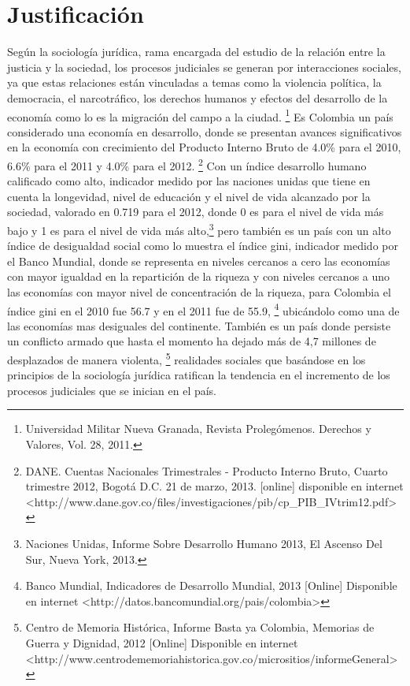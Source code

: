 \chapter{Justificaci\'on}
\label{sec:justificacion}
Seg\'un la sociolog\'ia jur\'idica, rama encargada del estudio de la relaci\'on
entre la justicia y la sociedad, los procesos judiciales se generan por
interacciones sociales, ya que estas relaciones est\'an vinculadas a temas
como la violencia pol\'itica, la democracia, el narcotr\'afico, los derechos
humanos y efectos del desarrollo de la econom\'ia como lo es la migraci\'on
del campo a la ciudad. \footnote{Universidad Militar Nueva Granada, Revista Proleg\'omenos. Derechos y Valores, Vol. 28, 2011.} 
Es Colombia un pa\'is considerado una econom\'ia en desarrollo, donde se presentan
avances significativos en la econom\'ia con crecimiento del Producto 
Interno Bruto de 4.0\% para el 2010, 6.6\% para el 2011 y 4.0\% para el 2012. 
\footnote{DANE. Cuentas Nacionales Trimestrales - Producto Interno Bruto, Cuarto trimestre 2012, Bogot\'a D.C. 21 de marzo, 2013. [online]  disponible en internet \textless  http://www.dane.gov.co/files/investigaciones/pib/cp_PIB_IVtrim12.pdf\textgreater} 
Con un \'indice desarrollo humano calificado como alto, indicador medido 
por las naciones unidas que tiene en cuenta la longevidad, nivel de 
educaci\'on y el nivel de vida alcanzado por la sociedad, valorado en 
0.719 para el 2012, donde 0 es para el nivel de vida m\'as bajo y 1 es 
para el nivel de vida m\'as alto,\footnote{Naciones Unidas, Informe Sobre Desarrollo Humano 2013, El Ascenso Del Sur, Nueva York, 2013.}  pero tambi\'en es un pa\'is con
un alto \'indice de desigualdad social como lo muestra el \'indice gini, 
indicador medido por el Banco Mundial, donde se representa en niveles 
cercanos a cero las econom\'ias con mayor igualdad en la repartici\'on de 
la riqueza y con niveles cercanos a uno las econom\'ias con mayor nivel 
de concentraci\'on de la riqueza, para Colombia el \'indice gini en el 2010 
fue 56.7 y en el 2011 fue de 55.9, \footnote{Banco Mundial, Indicadores de Desarrollo Mundial, 2013 [Online] Disponible en internet \textless  http://datos.bancomundial.org/pais/colombia\textgreater} ubic\'andolo como 
una de las econom\'ias mas desiguales del continente. Tambi\'en es un pa\'is 
donde persiste un conflicto armado que hasta el momento ha dejado m\'as 
de 4,7 millones de desplazados de manera violenta,
\footnote{Centro de Memoria Hist\'orica, Informe Basta ya Colombia, Memorias de Guerra y Dignidad, 2012 [Online] Disponible en internet \textless http://www.centrodememoriahistorica.gov.co/micrositios/informeGeneral\textgreater} 
realidades sociales que bas\'andose en los principios de la sociolog\'ia 
jur\'idica ratifican la tendencia en el incremento de los procesos 
judiciales que se inician en el pa\'is.
